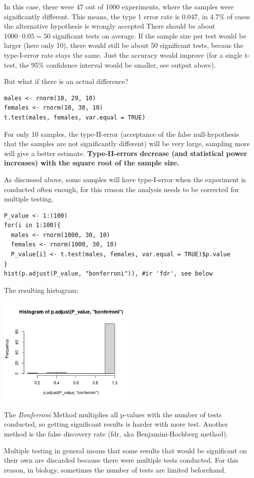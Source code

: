 \documentclass{article}
\begin{document}
In this case, there were 47 out of 1000 experiments, where the samples were significantly different. This means, the type 1 error rate is 0.047, in 4.7\% of cases the alternative hypothesis is wrongly accepted There should be about $1000\cdot 0.05 = 50$ significant tests on average. If the sample size per test would be larger (here only 10), there would still be about 50 significant tests, becaus the type-I-error rate stays the same. Just the accuracy would improve (for a single t-test, the 95\% confidence interval would be smaller, see output above).\par
But what if there is an actual difference?

\begin{lstlisting}
males <- rnorm(10, 29, 10)
females <- rnorm(10, 30, 10)
t.test(males, females, var.equal = TRUE)
\end{lstlisting}
For only 10 samples, the type-II-error (acceptance of the false null-hypothesis that the samples are not significantly different) will be very large, sampling more will give a better estimate. \textbf{Type-II-errors decrease (and statistical power increases) with the square root of the sample size.}\par 
As discussed above, some samples will have type-I-error when the experiment is conducted often enough, for this reason the analysis needs to be corrected for multiple testing.\par
\begin{lstlisting}
P_value <- 1:(100)
for(i in 1:100){
  males <- rnorm(1000, 30, 10)
  females <- rnorm(1000, 30, 10)
  P_value[i] <- t.test(males, females, var.equal = TRUE)$p.value
}
hist(p.adjust(P_value, "bonferroni")), #ir 'fdr', see below
\end{lstlisting}
The resulting histogram:
\begin{center}
    \includegraphics[width = 0.5\textwidth]{lab1/multiple_testing.png}
\end{center}
The \textit{Bonferroni} Method multiplies all p-values with the number of tests conducted, so getting significant results is harder with more test. Another method is the false discovery rate (fdr, aka Benjamini-Hochberg method).\par
Multiple testing in general means that some results that would be significant on their own are discarded because there were multiple tests conducted. For this reason, in biology, sometimes the number of tests are limited beforehand.
\end{document}

